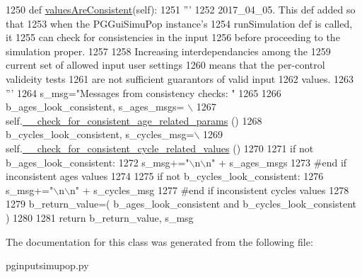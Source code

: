 \begin{DoxyCode}
1250     \textcolor{keyword}{def }\hyperlink{classnegui_1_1pginputsimupop_1_1PGInputSimuPop_a0bdcb5724f48860a0034162fa91dccfe}{valuesAreConsistent}(self):
1251         \textcolor{stringliteral}{'''}
1252 \textcolor{stringliteral}{        2017\_04\_05. This def added so that }
1253 \textcolor{stringliteral}{        when the PGGuiSimuPop instance's }
1254 \textcolor{stringliteral}{        runSimulation def is called, it}
1255 \textcolor{stringliteral}{        can check for consistencies in the input}
1256 \textcolor{stringliteral}{        before proceeding to the simulation proper.}
1257 \textcolor{stringliteral}{}
1258 \textcolor{stringliteral}{        Increasing interdependancies among the }
1259 \textcolor{stringliteral}{        current set of allowed input user settings}
1260 \textcolor{stringliteral}{        means that the per-control valideity tests}
1261 \textcolor{stringliteral}{        are not sufficient guarantors of valid input}
1262 \textcolor{stringliteral}{        values.}
1263 \textcolor{stringliteral}{        '''}
1264         s\_msg=\textcolor{stringliteral}{"Messages from consistency checks: "} 
1265 
1266         b\_ages\_look\_consistent, s\_ages\_msgs= \(\backslash\)
1267                     self.\hyperlink{classnegui_1_1pginputsimupop_1_1PGInputSimuPop_a5338963d5319cd749f7ab4d03c920d73}{\_\_check\_for\_consistent\_age\_related\_params}
      ()
1268         b\_cycles\_look\_consistent, s\_cycles\_msg=\(\backslash\)
1269                     self.\hyperlink{classnegui_1_1pginputsimupop_1_1PGInputSimuPop_aeb036e95eeb672f3e4ff4d8b70e7b428}{\_\_check\_for\_consistent\_cycle\_related\_values}
      ()
1270 
1271         \textcolor{keywordflow}{if} \textcolor{keywordflow}{not} b\_ages\_look\_consistent:
1272             s\_msg+=\textcolor{stringliteral}{"\(\backslash\)n\(\backslash\)n"} + s\_ages\_msgs
1273         \textcolor{comment}{#end if inconsistent ages values }
1274 
1275         \textcolor{keywordflow}{if} \textcolor{keywordflow}{not} b\_cycles\_look\_consistent:
1276             s\_msg+=\textcolor{stringliteral}{"\(\backslash\)n\(\backslash\)n"} + s\_cycles\_msg
1277         \textcolor{comment}{#end if  inconsistent cycles values}
1278 
1279         b\_return\_value=( b\_ages\_look\_consistent \textcolor{keywordflow}{and} b\_cycles\_look\_consistent )
1280 
1281         \textcolor{keywordflow}{return} b\_return\_value, s\_msg
\end{DoxyCode}


The documentation for this class was generated from the following file\+:\begin{DoxyCompactItemize}
\item 
pginputsimupop.\+py\end{DoxyCompactItemize}
